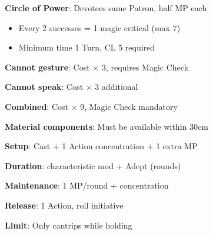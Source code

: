 \documentclass[10pt,a4paper,landscape]{article}
\begin{document}
\begin{multicols}{3}
\begin{tcolorbox}[title=MAGIC ALTERATIONS]
			\textbf{Circle of Power}: Devotees same Patron, half MP each
			\begin{itemize}[leftmargin=*,noitemsep]
				\item Every 2 successes = 1 magic critical (max 7)
				\item Minimum time 1 Turn, CL 5 required
			\end{itemize}
		\end{tcolorbox}
		
		\begin{tcolorbox}[title=IMPEDIMENTS]
			\textbf{Cannot gesture}: Cost $\times$ 3, requires Magic Check
			
			\textbf{Cannot speak}: Cost $\times$ 3 additional
			
			\textbf{Combined}: Cost $\times$ 9, Magic Check mandatory
			
			\textbf{Material components}: Must be available within 30cm
		\end{tcolorbox}
		
		\begin{tcolorbox}[title=HOLDING MAGIC]
			\textbf{Setup}: Cast + 1 Action concentration + 1 extra MP
			
			\textbf{Duration}: characteristic mod + Adept (rounds)
			
			\textbf{Maintenance}: 1 MP/round + concentration
			
			\textbf{Release}: 1 Action, roll initiative
			
			\textbf{Limit}: Only cantrips while holding
		\end{tcolorbox}
		
	\end{multicols}
	
\end{document}
